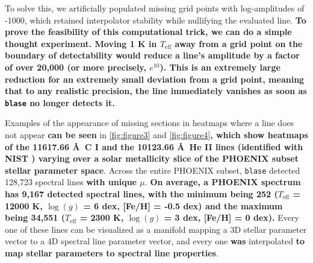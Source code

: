 \documentclass[twocolumn, linenumbers]{aastex631}
\begin{document}
To solve this, we artificially populated missing grid points with log-amplitudes of -1000, which retained interpolator stability while nullifying the evaluated line.
\textbf{To prove the feasibility of this computational trick, we can do a simple thought experiment.
Moving 1 K in $T_\text{eff}$ away from a grid point on the boundary of detectability would reduce a line's amplitude by a factor of over 20,000 (or more precisely, $e^{10}$).
This is an extremely large reduction for an extremely small deviation from a grid point, meaning that to any realistic precision, the line immediately vanishes as soon as \texttt{blase} no longer detects it.}

Examples of the appearance of missing sections in heatmaps where a line does not appear \textbf{can be seen} in \autoref{fig:figure3} and \autoref{fig:figure4}\textbf{, which show heatmaps of the 11617.66 \AA \ C I and the 10123.66 \AA \ He II lines (identified with NIST \citep{NIST}) varying over a solar metallicity slice of the PHOENIX subset stellar parameter space}.
Across the entire PHOENIX subset, \texttt{blase} detected 128,723 spectral lines \textbf{with unique $\mu$}.
\textbf{On average, a PHOENIX spectrum has 9,167 detected spectral lines, with the minimum being 252 ($T_\text{eff}$ = 12000 K, $\log(g)$ = 6 dex, [Fe/H] = -0.5 dex) and the maximum being 34,551 ($T_\text{eff}$ = 2300 K, $\log(g)$ = 3 dex, [Fe/H] = 0 dex).}
Every one of these lines can be visualized as a manifold mapping a 3D stellar parameter vector to a 4D spectral line parameter vector, and every one \textbf{was} interpolated \textbf{to map stellar parameters to spectral line properties}.
\end{document}
